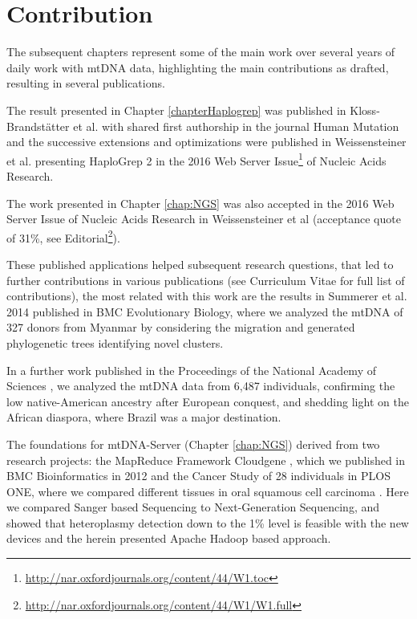 \section{Contribution}
The subsequent chapters represent some of the main work over several years of daily work with mtDNA data, highlighting the main contributions as drafted, resulting in several publications. 

The result presented in Chapter \ref{chapterHaplogrep} was published in Kloss-Brandst\"atter et al. with shared first authorship in the journal Human Mutation \cite{Kloss-Brandstatter2011} and the successive extensions and optimizations were published in Weissensteiner et al. presenting HaploGrep 2 in the 2016 Web Server Issue\footnote{\url{http://nar.oxfordjournals.org/content/44/W1.toc}} of Nucleic Acids Research\cite{Weissensteiner2016a}.

The work presented in Chapter \ref{chap:NGS} was also accepted in the 2016 Web Server Issue of Nucleic Acids Research in Weissensteiner et al \cite{Weissensteiner2016b} (acceptance quote of 31\%, see Editorial\footnote{\url{http://nar.oxfordjournals.org/content/44/W1/W1.full}}).

These published applications helped subsequent research questions, that led to further contributions in various publications (see Curriculum Vitae for full list of contributions), the most related with this work are the results in Summerer et al. 2014 published in BMC Evolutionary Biology, \cite{Summerer2014} where we analyzed the mtDNA of 327 donors from Myanmar by considering the migration and generated phylogenetic trees identifying novel clusters. 

In a further work published in the Proceedings of the National Academy of Sciences \cite{Kehdy2015}, we analyzed the mtDNA data from 6,487 individuals, confirming the low native-American ancestry after European conquest, and shedding light on the African diaspora, where Brazil was a major destination.

The foundations for mtDNA-Server (Chapter \ref{chap:NGS}) derived from two research projects: the MapReduce Framework Cloudgene \cite{Schonherr2012}, which we published in BMC Bioinformatics in 2012 and the Cancer Study of 28 individuals in PLOS ONE, where we compared different tissues in oral squamous cell carcinoma \cite{Kloss-Brandstatter2015}. Here we compared Sanger based Sequencing to Next-Generation Sequencing, and showed that heteroplasmy detection down to the 1\% level is feasible with the new devices and the herein presented Apache Hadoop based approach. 

